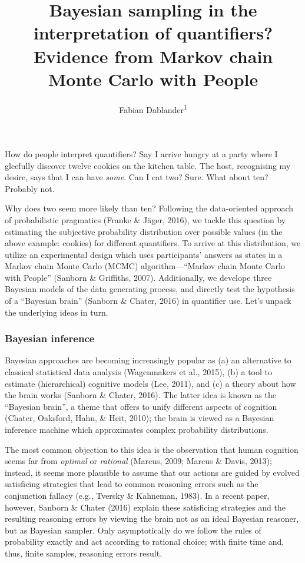 \documentclass[english,floatsintext,man]{apa6}
\title{Bayesian sampling in the interpretation of quantifiers? Evidence from
Markov chain Monte Carlo with People}
\author{Fabian Dablander\textsuperscript{1}}
\affiliation{
    \vspace{0.5cm}
          \textsuperscript{1} University of Tübingen  }
\begin{document}
\maketitle

\setcounter{secnumdepth}{0}



How do people interpret quantifiers? Say I arrive hungry at a party
where I gleefully discover twelve cookies on the kitchen table. The
host, recognising my desire, says that I can have \emph{some}. Can I eat
two? Sure. What about ten? Probably not.

Why does two seem more likely than ten? Following the data-oriented
approach of probabilistic pragmatics (Franke \& Jäger, 2016), we tackle
this question by estimating the subjective probability distribution over
possible values (in the above example: cookies) for different
quantifiers. To arrive at this distribution, we utilize an experimental
design which uses participants' answers as states in a Markov chain
Monte Carlo (MCMC) algorithm---\enquote{Markov chain Monte Carlo with
People} (Sanborn \& Griffiths, 2007). Additionally, we develope three
Bayesian models of the data generating process, and directly test the
hypothesis of a \enquote{Bayesian brain} (Sanborn \& Chater, 2016) in
quantifier use. Let's unpack the underlying ideas in turn.

\subsubsection{Bayesian inference}\label{bayesian-inference}

Bayesian approaches are becoming increasingly popular as (a) an
alternative to classical statistical data analysis (Wagenmakers et al.,
2015), (b) a tool to estimate (hierarchical) cognitive models (Lee,
2011), and (c) a theory about how the brain works (Sanborn \& Chater,
2016). The latter idea is known as the \enquote{Bayesian brain}, a theme
that offers to unify different aspects of cognition (Chater, Oaksford,
Hahn, \& Heit, 2010); the brain is viewed as a Bayesian inference
machine which approximates complex probability distributions.

The most common objection to this idea is the observation that human
cognition seems far from \emph{optimal} or \emph{rational} (Marcus,
2009; Marcus \& Davis, 2013); instead, it seems more plausible to assume
that our actions are guided by evolved satisficing strategies that lead
to common reasoning errors such as the conjunction fallacy (e.g.,
Tversky \& Kahneman, 1983). In a recent paper, however, Sanborn \&
Chater (2016) explain these satisficing strategies and the resulting
reasoning errors by viewing the brain not as an ideal Bayesian reasoner,
but as Bayesian sampler. Only asymptotically do we follow the rules of
probability exactly and act according to rational choice; with finite
time and, thus, finite samples, reasoning errors result.
\end{document}
